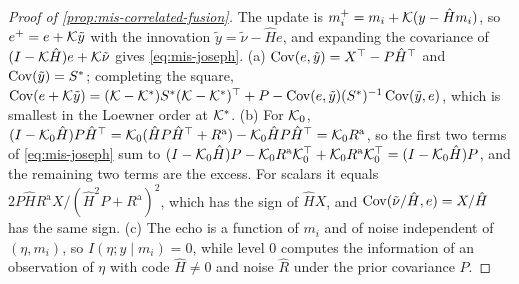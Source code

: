 \begin{proof}[Proof of \cref{prop:mis-correlated-fusion}]
The update is $m_i^+=m_i+\mathcal{K}(y-\hat Hm_i)$, so $e^+=e+\mathcal{K}\tilde y$ with the innovation $\tilde y=\tilde\nu-\hat He$, and expanding the covariance of $(I-\mathcal{K}\hat H)e+\mathcal{K}\tilde\nu$ gives \eqref{eq:mis-joseph}. (a) $\operatorname{Cov}(e,\tilde y)=X^\top-P\hat H^\top$ and $\operatorname{Cov}(\tilde y)=S^\ast$; completing the square, $\operatorname{Cov}(e+\mathcal{K}\tilde y)=(\mathcal{K}-\mathcal{K}^\ast)S^\ast(\mathcal{K}-\mathcal{K}^\ast)^\top+P-\operatorname{Cov}(e,\tilde y)(S^\ast)^{-1}\operatorname{Cov}(\tilde y,e)$, which is smallest in the Loewner order at $\mathcal{K}^\ast$. (b) For $\mathcal{K}_0$, $(I-\mathcal{K}_0\hat H)P\hat H^\top=\mathcal{K}_0(\hat HP\hat H^\top+R^{\mathrm a})-\mathcal{K}_0\hat HP\hat H^\top=\mathcal{K}_0R^{\mathrm a}$, so the first two terms of \eqref{eq:mis-joseph} sum to $(I-\mathcal{K}_0\hat H)P-\mathcal{K}_0R^{\mathrm a}\mathcal{K}_0^\top+\mathcal{K}_0R^{\mathrm a}\mathcal{K}_0^\top=(I-\mathcal{K}_0\hat H)P$, and the remaining two terms are the excess. For scalars it equals $2P\hat HR^{\mathrm a}X/(\hat H^2P+R^{\mathrm a})^2$, which has the sign of $\hat HX$, and $\operatorname{Cov}(\tilde\nu/\hat H,e)=X/\hat H$ has the same sign. (c) The echo is a function of $m_i$ and of noise independent of $(\eta,m_i)$, so $I(\eta;y\mid m_i)=0$, while level 0 computes the information of an observation of $\eta$ with code $\hat H\neq0$ and noise $\hat R$ under the prior covariance $P$.
\end{proof}

